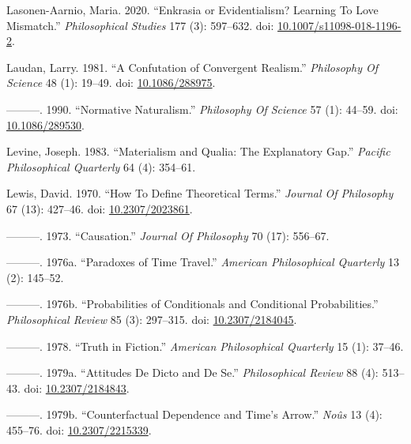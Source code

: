 \documentclass[
  10pt,
  letterpaper,
  DIV=11,
  numbers=noendperiod,
  twoside]{scrartcl}
\newlength{\cslhangindent}
\newenvironment{CSLReferences}[2] %
 {\begin{list}{}{%
  \setlength{\itemindent}{0pt}
  \setlength{\leftmargin}{0pt}
  \setlength{\parsep}{0pt}
  \ifodd #1
   \setlength{\leftmargin}{\cslhangindent}
   \setlength{\itemindent}{-1\cslhangindent}
  \fi
  \setlength{\itemsep}{#2\baselineskip}}}
 {\end{list}}
\begin{document}
\begin{CSLReferences}{1}{0}
Lasonen-Aarnio, Maria. 2020. {``Enkrasia or Evidentialism? Learning To
Love Mismatch.''} \emph{Philosophical Studies} 177 (3): 597--632. doi:
\href{https://doi.org/10.1007/s11098-018-1196-2}{10.1007/s11098-018-1196-2}.

Laudan, Larry. 1981. {``A Confutation of Convergent Realism.''}
\emph{Philosophy Of Science} 48 (1): 19--49. doi:
\href{https://doi.org/10.1086/288975}{10.1086/288975}.

---------. 1990. {``Normative Naturalism.''} \emph{Philosophy Of
Science} 57 (1): 44--59. doi:
\href{https://doi.org/10.1086/289530}{10.1086/289530}.

Levine, Joseph. 1983. {``Materialism and Qualia: The Explanatory Gap.''}
\emph{Pacific Philosophical Quarterly} 64 (4): 354--61.

Lewis, David. 1970. {``How To Define Theoretical Terms.''} \emph{Journal
Of Philosophy} 67 (13): 427--46. doi:
\href{https://doi.org/10.2307/2023861}{10.2307/2023861}.

---------. 1973. {``Causation.''} \emph{Journal Of Philosophy} 70 (17):
556--67.

---------. 1976a. {``Paradoxes of Time Travel.''} \emph{American
Philosophical Quarterly} 13 (2): 145--52.

---------. 1976b. {``Probabilities of Conditionals and Conditional
Probabilities.''} \emph{Philosophical Review} 85 (3): 297--315. doi:
\href{https://doi.org/10.2307/2184045}{10.2307/2184045}.

---------. 1978. {``Truth in Fiction.''} \emph{American Philosophical
Quarterly} 15 (1): 37--46.

---------. 1979a. {``Attitudes De Dicto and De Se.''}
\emph{Philosophical Review} 88 (4): 513--43. doi:
\href{https://doi.org/10.2307/2184843}{10.2307/2184843}.

---------. 1979b. {``Counterfactual Dependence and Time's Arrow.''}
\emph{Noûs} 13 (4): 455--76. doi:
\href{https://doi.org/10.2307/2215339}{10.2307/2215339}.


\end{CSLReferences}
\end{document}
